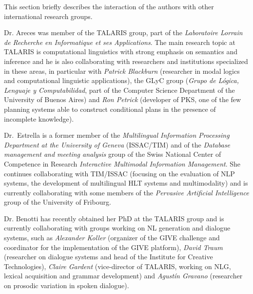 This section briefly describes the interaction of the authors with other
international research groups. 

Dr. Areces was member of the TALARIS group, part of the \emph{Laboratoire
Lorrain de Recherche en Informatique et ses Applications}. The main research
topic at TALARIS is computational linguistics with strong emphasis on semantics
and inference and he is also collaborating with researchers and institutions
specialized in these areas, in particular with \textit{Patrick Blackburn}
(researcher in modal logics and computational linguistic applications), the GLyC
group (\textit{Grupo de L\'ogica, Lenguaje y Computabilidad}, part of the
Computer Science Department of the University of Buenos Aires) and \textit{Ron
Petrick} (developer of PKS, one of the few planning systems able to construct
conditional plans in the presence of incomplete knowledge). 

Dr.\ Estrella is a former member of the \textit{Multilingual Information
Processing Department at the University of Geneva} (ISSAC/TIM) and of the
\emph{Database management
and meeting
analysis} group of the Swiss National Center of Competence in Research                                                                                                                                                                                                                                                                                                                                                                                                                                                                                                                                                                                                                                                                                                                                            
\emph{Interactive Multimodal Information Management}. She continues
collaborating with TIM/ISSAC (focusing on the evaluation of NLP systems, the
development of multilingual HLT systems and multimodality) and is currently
collaborating with some members of the \textit{Pervasive Artificial
Intelligence} group of the University of Fribourg. 

Dr. Benotti has recently obtained her PhD at the TALARIS group and is currently
collaborating with groups working on NL generation and dialogue systems, such as
\textit{Alexander Koller} (organizer of the GIVE challenge and coordinator for
the implementation of the GIVE platform), \textit{David Traum} (researcher on
dialogue systems and head of the Institute for Creative Technologies),
\textit{Claire Gardent} (vice-director of TALARIS, working on NLG, lexical
acquisition and grammar development) and \textit{Agust\'in Gravano} (researcher
on prosodic variation in spoken dialogue).
